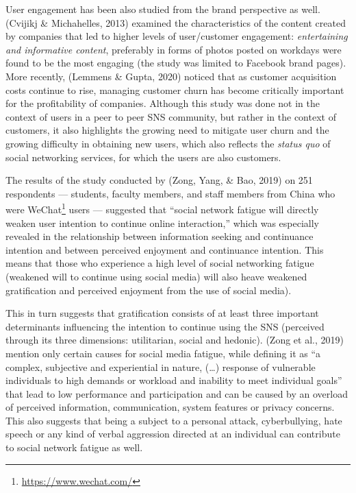 \documentclass[10pt,dvipsnames]{scrartcl}
\begin{document}
User engagement has been also studied from the brand perspective as
well. (Cvijikj \& Michahelles, 2013) examined the characteristics of the
content created by companies that led to higher levels of user/customer
engagement: \textit{entertaining and informative content}, preferably in
forms of photos posted on workdays were found to be the most engaging
(the study was limited to Facebook brand pages). More recently, (Lemmens
\& Gupta, 2020) noticed that as customer acquisition costs continue to
rise, managing customer churn has become critically important for the
profitability of companies. Although this study was done not in the
context of users in a peer to peer SNS community, but rather in the
context of customers, it also highlights the growing need to mitigate
user churn and the growing difficulty in obtaining new users, which also
reflects the \textit{status quo} of social networking services, for
which the users are also customers.

The results of the study conducted by (Zong, Yang, \& Bao, 2019) on 251
respondents --- students, faculty members, and staff members from China
who were WeChat\footnote{\url{https://www.wechat.com/}} users ---
suggested that ``social network fatigue will directly weaken user
intention to continue online interaction,'' which was especially
revealed in the relationship between information seeking and continuance
intention and between perceived enjoyment and continuance intention.
This means that those who experience a high level of social networking
fatigue (weakened will to continue using social media) will also heave
weakened gratification and perceived enjoyment from the use of social
media).

This in turn suggests that gratification consists of at least three
important determinants influencing the intention to continue using the
SNS (perceived through its three dimensions: utilitarian, social and
hedonic). (Zong et al., 2019) mention only certain causes for social
media fatigue, while defining it as ``a complex, subjective and
experiential in nature, (\dots) response of vulnerable individuals to
high demands or workload and inability to meet individual goals'' that
lead to low performance and participation and can be caused by an
overload of perceived information, communication, system features or
privacy concerns. This also suggests that being a subject to a personal
attack, cyberbullying, hate speech or any kind of verbal aggression
directed at an individual can contribute to social network fatigue as
well.
\end{document}
